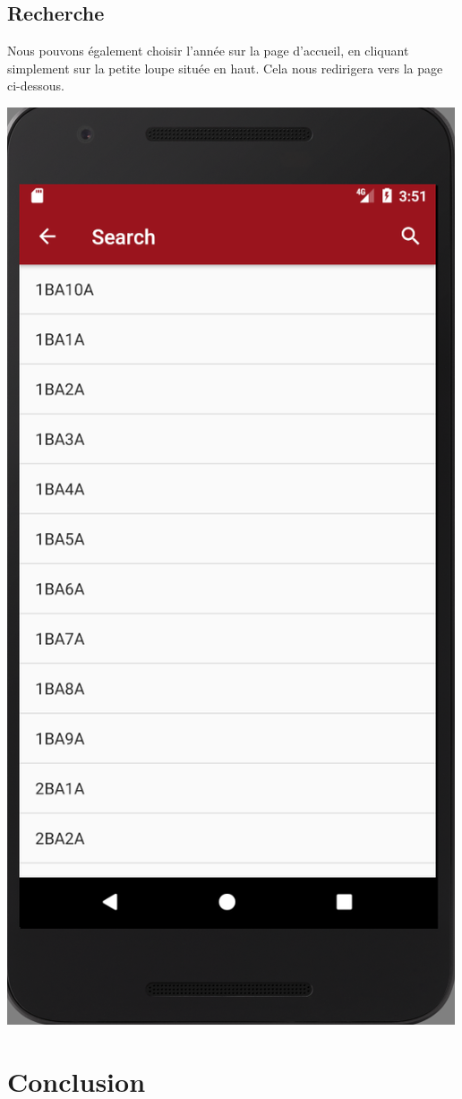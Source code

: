 \documentclass{article}
\begin{document}
	\subsection{Recherche}
	Nous pouvons \'egalement choisir l'ann\'ee sur la page d'accueil, en cliquant simplement sur la petite loupe situ\'ee en haut. Cela nous redirigera vers la page ci-dessous.
            \begin{center}
            \includegraphics[scale=0.4]{img/search.png}
            \end{center}
            
	
	

	\section{Conclusion}
\end{document}
